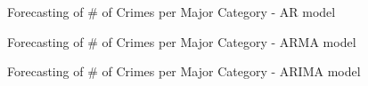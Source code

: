 \documentclass[12pt]{beamer}
\begin{document}
        \begin{frame}{Forecasting of \# of Crimes per Major Category - AR model}
            \begin{figure}
                \centering
            \end{figure}
        \end{frame}

        \begin{frame}{Forecasting of \# of Crimes per Major Category - ARMA model}
            \begin{figure}
                \centering
            \end{figure}
        \end{frame}

        \begin{frame}{Forecasting of \# of Crimes per Major Category - ARIMA model}
            \begin{figure}
                \centering
            \end{figure}
        \end{frame}
\end{document}
